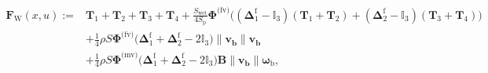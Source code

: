 \begin{align}
\nonumber
\boldsymbol{F}_{\text{W}}(x,u) :={}&  \boldsymbol{T}_{1} + \boldsymbol{T}_{2} + \boldsymbol{T}_{3} + \boldsymbol{T}_{4} + \frac{S_{\text{wet}}}{4S_{\text{p}}} \boldsymbol{\Phi}^{\text{(fv)}} \Big( (\boldsymbol{\Delta}^{\text{f}}_1 - \mathbb{I}_{3} ) (\boldsymbol{T}_{1}+\boldsymbol{T}_{2}) + ( \boldsymbol{\Delta}^{\text{f}}_2 - \mathbb{I}_{3}) (\boldsymbol{T}_{3}+\boldsymbol{T}_{4})\Big) \\ 
     \label{eq:FbColibri}
    &+ \frac{1}{4} \rho S  \boldsymbol{\Phi}^{\text{(fv)}} \Big(\boldsymbol{\Delta}^{\text{f}}_1+ \boldsymbol{\Delta}^{\text{f}}_2 - 2 \mathbb{I}_{3} \Big) \lVert \boldsymbol{v_{\text{b}}} \rVert \boldsymbol{v_{\text{b}}}\\
    \nonumber
    &+ \frac{1}{4} \rho S \boldsymbol{\Phi}^{\text{(mv)}} \Big(\boldsymbol{\Delta}^{\text{f}}_1 + \boldsymbol{\Delta}^{\text{f}}_2 - 2\mathbb{I}_{3}\Big) \boldsymbol{B} \lVert \boldsymbol{v_{\text{b}}} \rVert  \boldsymbol{\omega}_{\text{b}}, 
\end{align}

